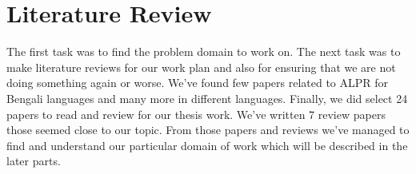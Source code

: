 
\section{Literature Review}
The first task was to find the problem domain to work on. The next task was to make literature reviews for our work plan and also for ensuring that we are not doing something again or worse. We've found few papers related to ALPR for Bengali languages and many more in different languages. Finally, we did select 24 papers to read and review for our thesis work. We've written 7 review papers those seemed close to our topic. From those papers and reviews we've managed to find and understand our particular domain of work which will be described in the later parts.
